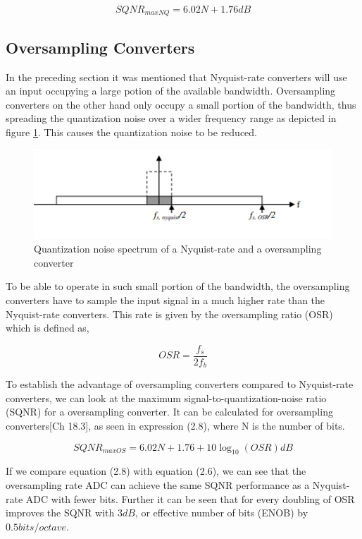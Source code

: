 \begin{equation}\label{no_noise_sqnr}
    SQNR_{maxNQ} = 6.02N + 1.76 dB
\end{equation}

\subsection{Oversampling Converters}
In the preceding section it was mentioned that Nyquist-rate converters will use an input occupying a large potion of the available bandwidth. Oversampling converters on the other hand only occupy a small portion of the bandwidth, thus spreading the quantization noise over a wider frequency range as depicted in figure \ref{fig:oversample}. This causes the quantization noise to be reduced.  

\begin{figure}[h]
\centering
\includegraphics[scale=1]{images/oversample.png}
\caption{Quantization noise spectrum of a Nyquist-rate and a oversampling converter}
\label{fig:oversample}
\end{figure}

To be able to operate in such small portion of the bandwidth, the oversampling converters have to sample the input signal in a much higher rate than the Nyquist-rate converters. This rate is given by the oversampling ratio (OSR) which is defined as,

\begin{equation}
    OSR = \frac{f_s}{2f_b}
\end{equation}

To establish the advantage of oversampling converters compared to Nyquist-rate converters, we can look at the maximum signal-to-quantization-noise ratio (SQNR) for a oversampling converter. It can be calculated for oversampling converters\cite{Johns}[Ch 18.3], as seen in expression (2.8), where N is the number of bits.


\begin{equation}
    SQNR_{maxOS} = 6.02N + 1.76 + 10\log_{10}(OSR) dB
\end{equation}

If we compare equation (2.8) with equation (2.6), we can see that the oversampling rate ADC can achieve the same SQNR performance as a Nyquist-rate ADC with fewer bits. Further it can be seen that for every doubling of OSR improves the SQNR with $3 dB$, or effective number of bits (ENOB) by $0.5bits/octave$. 

